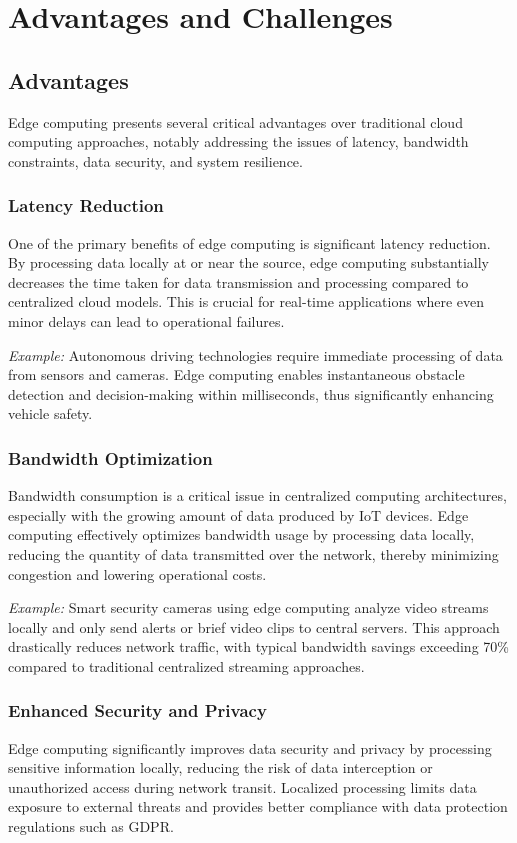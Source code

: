 \documentclass[runningheads]{llncs}
\begin{document}
\section{Advantages and Challenges}
\subsection{Advantages}

Edge computing presents several critical advantages over traditional cloud computing approaches, notably addressing the issues of latency, bandwidth constraints, data security, and system resilience.

\subsubsection{Latency Reduction}
One of the primary benefits of edge computing is significant latency reduction. By processing data locally at or near the source, edge computing substantially decreases the time taken for data transmission and processing compared to centralized cloud models. This is crucial for real-time applications where even minor delays can lead to operational failures.

\textit{Example:} Autonomous driving technologies require immediate processing of data from sensors and cameras. Edge computing enables instantaneous obstacle detection and decision-making within milliseconds, thus significantly enhancing vehicle safety.

\subsubsection{Bandwidth Optimization}
Bandwidth consumption is a critical issue in centralized computing architectures, especially with the growing amount of data produced by IoT devices. Edge computing effectively optimizes bandwidth usage by processing data locally, reducing the quantity of data transmitted over the network, thereby minimizing congestion and lowering operational costs.

\textit{Example:} Smart security cameras using edge computing analyze video streams locally and only send alerts or brief video clips to central servers. This approach drastically reduces network traffic, with typical bandwidth savings exceeding 70\% compared to traditional centralized streaming approaches.

\subsubsection{Enhanced Security and Privacy}
Edge computing significantly improves data security and privacy by processing sensitive information locally, reducing the risk of data interception or unauthorized access during network transit. Localized processing limits data exposure to external threats and provides better compliance with data protection regulations such as GDPR.
\end{document}

